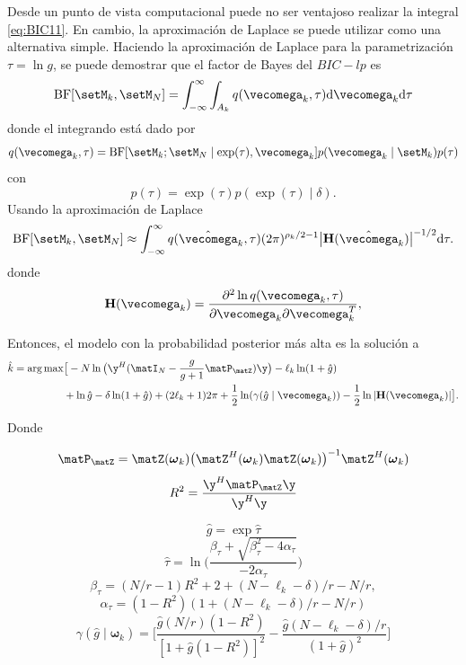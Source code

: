 	Desde un punto de vista computacional puede no ser ventajoso realizar la integral \eqref{eq:BIC11}. En cambio, la aproximación de Laplace se puede utilizar como una alternativa simple. Haciendo la aproximación de Laplace para la parametrización $\tau = \ln g$, se puede demostrar que el factor de Bayes del $BIC-lp$ es \cite{Nielsen2013}
	\begin{equation}
		\mathrm{BF}[\setM_k,\setM_N] = \int_{-\infty}^{\infty}\int_{A_k}q(\vecomega_k,\tau)\mathrm{d}\vecomega_k\mathrm{d}\tau
	\end{equation}
	donde el integrando está dado por
	\begin{equation}
		q(\vecomega_k,\tau) = \mathrm{BF}[\setM_k;\setM_N\mid \exp(\tau),\vecomega_k]p(\vecomega_k\mid\setM_k)p(\tau)
		\label{eq:BIC12}
	\end{equation}
	con
	\[p(\tau) = \exp(\tau)p(\exp(\tau)\mid\delta).\]
	Usando la aproximación de Laplace
	\begin{equation}
		\mathrm{BF}[\setM_k,\setM_N] \approx \int_{-\infty}^{\infty} q(\hat{\vecomega}_k,\tau)(2\pi)^{\rho_k/2-1}\big|\mathbf{H}(\hat{\vecomega}_k)\big|^{-1/2}\mathrm{d}\tau.
		\label{eq:BIC13} 
	\end{equation}
	donde 
	\begin{equation}
		\mathbf{H}(\vecomega_k) = \frac{\partial^2\ln q(\vecomega_k,\tau)}{\partial\vecomega_k\partial\vecomega_k^T}, 
		\label{eq:BIC14}
	\end{equation}
	
	Entonces, el modelo con la probabilidad posterior más alta es la solución a
	\begin{equation}
		\begin{aligned}
			\hat{k} = \arg\max &\big[ -N\ln\big(\y^H(\matI_N-\frac{g}{g+1}\matP_\matZ)\y\big)-\ell_k\ln(1+\hat{g})\\ & +  \ln\hat{g} - \delta\ln(1+\hat{g}) + (2\ell_k+1)2\pi + \frac{1}{2}\ln(\gamma(\hat{g}\mid\vecomega_k)) - \frac{1}{2}\ln|\mathbf{H}(\vecomega_k)|\big].
		\end{aligned}
		\label{Eq:BIC15}
	\end{equation}
	
	Donde 
	
	\[\matP_\matZ = \matZ(\boldsymbol{\omega}_k)\big(\matZ^H(\boldsymbol{\omega}_k)\matZ(\boldsymbol{\omega}_k)\big)^{-1}\matZ^H(\boldsymbol{\omega}_k)\]
	\[R^2 = \frac{\y^H\matP_\matZ\y}{\y^H\y}\]
	
	\[\hat{g} = \exp\hat{\tau}\]
	\[\hat{\tau} = \ln\bigg(\frac{\beta_\tau + \sqrt{\beta_\tau^2 - 4\alpha_\tau}}{-2\alpha_\tau}\bigg)\]
	\[\beta_\tau = (N/r-1)R^2 + 2 + (N-\ell_k-\delta)/r - N/r,\]
	\[\alpha_\tau = (1-R^2)(1+(N-\ell_k-\delta)/r - N/r)\]
	\[\gamma(\hat{g}\mid\boldsymbol{\omega}_k) = \bigg[\frac{\hat{g}(N/r)(1-R^2)}{[1+\hat{g}(1-R^2)]^2}-\frac{\hat{g}(N-\ell_k-\delta)/r}{(1+\hat{g})^2}\bigg]\]
	
